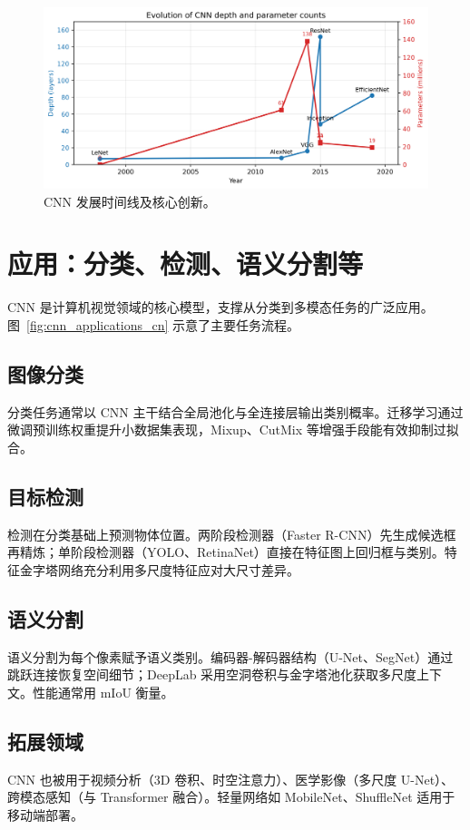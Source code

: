 ﻿\documentclass[UTF8,zihao=-4]{ctexart}
\begin{document}
\begin{figure}[H]
  \centering
  \includegraphics[width=0.85\linewidth]{cnn_architecture_evolution.png}
  \caption{CNN 发展时间线及核心创新。}
  \label{fig:cnn_timeline_cn}
\end{figure}
\FloatBarrier

\section{应用：分类、检测、语义分割等}
CNN 是计算机视觉领域的核心模型，支撑从分类到多模态任务的广泛应用。图~\ref{fig:cnn_applications_cn} 示意了主要任务流程。

\subsection{图像分类}
分类任务通常以 CNN 主干结合全局池化与全连接层输出类别概率。迁移学习通过微调预训练权重提升小数据集表现，Mixup、CutMix 等增强手段能有效抑制过拟合。

\subsection{目标检测}
检测在分类基础上预测物体位置。两阶段检测器（Faster R-CNN）先生成候选框再精炼；单阶段检测器（YOLO、RetinaNet）直接在特征图上回归框与类别。特征金字塔网络充分利用多尺度特征应对大尺寸差异。

\subsection{语义分割}
语义分割为每个像素赋予语义类别。编码器-解码器结构（U-Net、SegNet）通过跳跃连接恢复空间细节；DeepLab 采用空洞卷积与金字塔池化获取多尺度上下文。性能通常用 mIoU 衡量。

\subsection{拓展领域}
CNN 也被用于视频分析（3D 卷积、时空注意力）、医学影像（多尺度 U-Net）、跨模态感知（与 Transformer 融合）。轻量网络如 MobileNet、ShuffleNet 适用于移动端部署。
\end{document}
